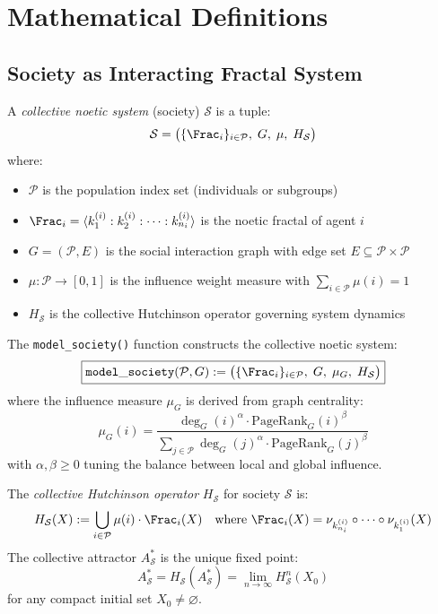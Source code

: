 \section{Mathematical Definitions}
\label{sec:se-definitions}

\subsection{Society as Interacting Fractal System}

\begin{definition}
\label{def:collective-noetic-system}
A \emph{collective noetic system} (society) $\mathcal{S}$ is a tuple:
\[
    \mathcal{S} = \bigl( \{\Frac_i\}_{i \in \mathcal{P}}, \; G, \; \mu, \; H_{\mathcal{S}} \bigr)
\]
where:
\begin{itemize}
    \item $\mathcal{P}$ is the population index set (individuals or subgroups)
    \item $\Frac_i = \langle k_1^{(i)} : k_2^{(i)} : \cdots : k_{n_i}^{(i)} \rangle$ is the noetic fractal of agent $i$
    \item $G = (\mathcal{P}, E)$ is the social interaction graph with edge set $E \subseteq \mathcal{P} \times \mathcal{P}$
    \item $\mu : \mathcal{P} \to [0,1]$ is the influence weight measure with $\sum_{i \in \mathcal{P}} \mu(i) = 1$
    \item $H_{\mathcal{S}}$ is the collective Hutchinson operator governing system dynamics
\end{itemize}
\end{definition}

\begin{definition}
\label{def:model-society}
The \texttt{model\_society()} function constructs the collective noetic system:
\[
\boxed{
    \mathtt{model\_society}(\mathcal{P}, G) := \bigl( \{\Frac_i\}_{i \in \mathcal{P}}, \; G, \; \mu_G, \; H_{\mathcal{S}} \bigr)
}
\]
where the influence measure $\mu_G$ is derived from graph centrality:
\[
    \mu_G(i) = \frac{\deg_G(i)^{\alpha} \cdot \mathrm{PageRank}_G(i)^{\beta}}
    {\sum_{j \in \mathcal{P}} \deg_G(j)^{\alpha} \cdot \mathrm{PageRank}_G(j)^{\beta}}
\]
with $\alpha, \beta \geq 0$ tuning the balance between local and global influence.
\end{definition}

\begin{definition}
\label{def:collective-hutchinson}
The \emph{collective Hutchinson operator} $H_{\mathcal{S}}$ for society $\mathcal{S}$ is:
\[
    H_{\mathcal{S}}(X) := \bigcup_{i \in \mathcal{P}} \mu(i) \cdot \Frac_i(X)
    \quad \text{where } \Frac_i(X) = \nu_{k_{n_i}^{(i)}} \circ \cdots \circ \nu_{k_1^{(i)}}(X)
\]
The collective attractor $A_{\mathcal{S}}^*$ is the unique fixed point:
\[
    A_{\mathcal{S}}^* = H_{\mathcal{S}}(A_{\mathcal{S}}^*) = \lim_{n \to \infty} H_{\mathcal{S}}^n(X_0)
\]
for any compact initial set $X_0 \neq \varnothing$.
\end{definition}

